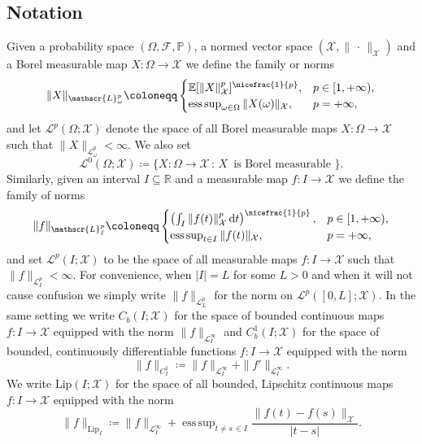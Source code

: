 \documentclass[11pt,oneside,english,reqno,dvipsnames,table]{amsart}
\numberwithin{equation}{section}
\theoremstyle{plain}
\theoremstyle{definition}
\theoremstyle{remark}
\theoremstyle{plain}
\theoremstyle{plain}
\theoremstyle{plain}
\theoremstyle{plain}
\theoremstyle{plain}
\theoremstyle{plain}
\theoremstyle{plain}
\newcommand{\scL}{\mathscr{L}}
\newcommand{\dd}{\mathop{}\!\mathrm{d}}
\newcommand{\mcF}{\mathcal{F}}
\newcommand{\mcX}{\mathcal{X}}
\newcommand{\mbE}{\mathbb{E}}
\newcommand{\mbP}{\mathbb{P}}
\newcommand{\mbR}{\mathbb{R}}
\newcommand{\msL}{\mathscr{L}}
\newcommand{\Lip}{\text{Lip}}
\DeclareMathOperator*{\esssup}{ess\,sup}
\numberwithin{thm}{section}
\begin{document}
\subsection{Notation}
%
Given a probability space $(\Omega,\mcF,\mbP)$, a normed vector space $(\mcX,\|\,\cdot\,\|_{\mcX})$ and a Borel measurable map $X:\Omega \to \mcX$ we define the family or norms
%
    \begin{equation*}
    \|X\|_{\scL^p_\omega}\coloneqq \begin{cases}
        \mbE[\|X\|^p_{\mcX}]^{\nicefrac{1}{p}}, & p\in [1,+\infty),\\
        \esssup_{\omega\in \Omega} \|X(\omega)\|_\mcX, & p=+\infty,
    \end{cases} 
\end{equation*}
%
and let $\msL^p(\Omega;\mcX)$ denote the space of all Borel measurable maps $X:\Omega\to \mcX$ such that $\|X\|_{\msL^p_\omega}<\infty$. We also set
%
\begin{equation*}
    \msL^0(\Omega;\mcX) \coloneqq \{X: \Omega \to \mcX\,:\, X \, \text{ is Borel measurable }\}.
\end{equation*}
%
Similarly, given an interval $I\subseteq \mbR$ and a measurable map $f:I\to \mcX$ we define the family of norms
%
  \begin{equation*}
    \|f\|_{\scL^p_I }\coloneqq \begin{cases}
       \left( \int_I \|f(t)\|^p_{\mcX}\dd t\right)^{\nicefrac{1}{p}}, & p\in [1,+\infty),\\
        \esssup_{t\in I} \|f(t)\|_\mcX, & p=+\infty,
    \end{cases} 
\end{equation*}
%
and set $\msL^p(I;\mcX)$ to be the space of all measurable maps $f:I\to \mcX$ such that $\|f\|_{\msL^p_I} <\infty$. For convenience, when $|I|= L$ for some $L>0$ and when it will not cause confusion we simply write $\|f\|_{\msL^p_L}$ for the norm on $\msL^p([0,L];\mcX)$. In the same setting we write $C_b(I;\mcX)$ for the space of bounded continuous maps $f:I\to \mcX$ equipped with the norm $\|f\|_{\msL^\infty_I}$ and $C^1_b(I;\mcX)$ for the space of bounded, continuously differentiable functions $f:I\to \mcX$ equipped with the norm
%
\begin{equation*}
    \|f\|_{C^1_I}\coloneqq \|f\|_{\msL^\infty_I} + \|f'\|_{\msL^\infty_I}.
\end{equation*}
%
We write $\text{Lip}(I;\mcX)$ for the space of all bounded, Lipschitz continuous maps $f:I\to \mcX$ equipped with the norm
%
\begin{equation}\label{eq:Lip_norm_def}
    \|f\|_{\Lip_I} \coloneqq \|f\|_{\msL^\infty_I}+ \esssup_{t\neq s \,\in I} \frac{\|f(t)-f(s)\|_{\mcX}}{|t-s|}. 
\end{equation}
\end{document}
